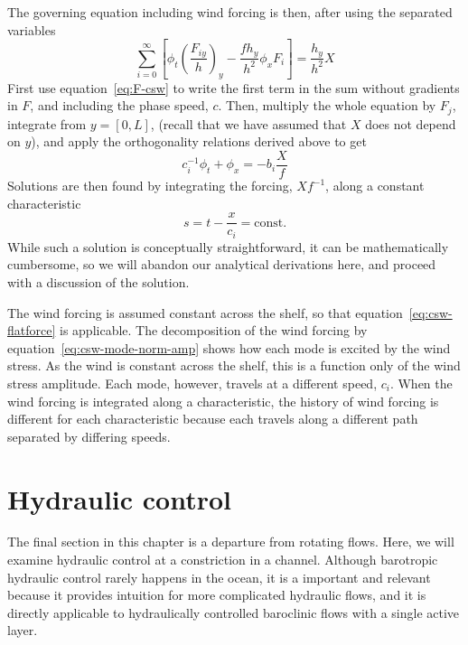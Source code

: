 \documentclass[11pt]{report}
\numberwithin{equation}{section}
\begin{document}
The governing equation including wind forcing is then, after using the separated variables
\begin{equation}
   \sum_{i=0}^\infty \left[ \phi_t \left( \frac{F_{iy}}{h} \right)_{y} - \frac{f h_y}{h^2} \phi_x F_i \right]= \frac{h_y}{h^2} X
\end{equation}
First use equation~\ref{eq:F-csw} to write the first term in the sum without gradients in $F$, and including the phase speed, $c$.  Then, multiply the whole equation by $F_j$, integrate from $y=[0, L]$, (recall that we have assumed that $X$ does not depend on $y$), and apply the orthogonality relations derived above to get
\begin{equation}
    c_i^{-1} \phi_t + \phi_x = -b_i \frac{X}{f}
\end{equation}
Solutions are then found by integrating the forcing, $X f^{-1}$, along a constant characteristic
\begin{equation}
    s = t - \frac{x}{c_i} = \mathrm{const.}
\end{equation}
While such a solution is conceptually straightforward, it can be mathematically cumbersome, so we will abandon our analytical derivations here, and proceed with a discussion of the solution.

The wind forcing is assumed constant across the shelf, so that equation~\ref{eq:csw-flatforce} is applicable.  The decomposition of the wind forcing by equation~\ref{eq:csw-mode-norm-amp} shows how each mode is excited by the wind stress.  As the wind is constant across the shelf, this is a function only of the wind stress amplitude.  Each mode, however, travels at a different speed, $c_i$.  When the wind forcing is integrated along a characteristic, the history of wind forcing is different for each characteristic because each travels along a different path separated by differing speeds.  



\section{Hydraulic control}

The final section in this chapter is a departure from rotating flows.  Here, we will examine hydraulic control at a constriction in a channel.  Although barotropic hydraulic control rarely happens in the ocean, it is a important and relevant because it provides intuition for more complicated hydraulic flows, and it is directly applicable to hydraulically controlled baroclinic flows with a single active layer.
\end{document}
